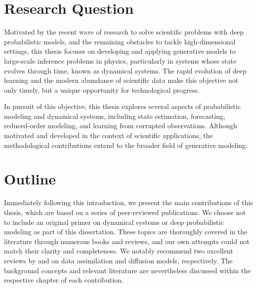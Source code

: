 \section{Research Question}

Motivated by the recent wave of research to solve scientific problems with deep probabilistic models, and the remaining obstacles to tackle high-dimensional settings, this thesis focuses on developing and applying generative models to large-scale inference problems in physics, particularly in systems whose state evolves through time, known as dynamical systems. The rapid evolution of deep learning and the modern abundance of scientific data make this objective not only timely, but a unique opportunity for technological progress.

In pursuit of this objective, this thesis explores several aspects of probabilistic modeling and dynamical systems, including state estimation, forecasting, reduced-order modeling, and learning from corrupted observations. Although motivated and developed in the context of scientific applications, the methodological contributions extend to the broader field of generative modeling.

\section{Outline}

Immediately following this introduction, we present the main contributions of this thesis, which are based on a series of peer-reviewed publications. We choose not to include an original primer on dynamical systems or deep probabilistic modeling as part of this dissertation. These topics are thoroughly covered in the literature through numerous books and reviews, and our own attempts could not match their clarity and completeness. We notably recommend two excellent reviews by \textcite{carrassi2018data} and \textcite{lai2025principles} on data assimilation and diffusion models, respectively. The background concepts and relevant literature are nevertheless discussed within the respective chapter of each contribution.

